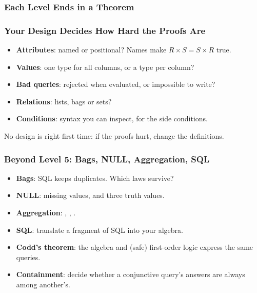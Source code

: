 \begin{frame*}
  \frametitle{Each Level Ends in a Theorem}
  {}
  \sketch
\end{frame*}

\begin{frame}
  \frametitle{Your Design Decides How Hard the Proofs Are}
  \begin{itemize}
    \item \textbf{Attributes}: named or positional? Names make
      $R \times S = S \times R$ true.
    \item \textbf{Values}: one type for all columns, or a type per
      column?
    \item \textbf{Bad queries}: rejected when evaluated, or impossible to
      write?
    \item \textbf{Relations}: lists, bags or sets?
    \item \textbf{Conditions}: syntax you can inspect, for the side
      conditions.
  \end{itemize}
  \begin{sticky}[halign = center]
    No design is right first time: if the proofs hurt, change the
    definitions.
  \end{sticky}
\end{frame}

\begin{frame}
  \frametitle{Beyond Level 5: Bags, NULL, Aggregation, SQL}
  \begin{itemize}
    \item \textbf{Bags}: SQL keeps duplicates. Which laws survive?
    \item \textbf{NULL}: missing values, and three truth values.
    \item \textbf{Aggregation}: , ,
      .
    \item \textbf{SQL}: translate a fragment of SQL into your algebra.
    \item \textbf{Codd's theorem}: the algebra and (safe) first-order
      logic express the same queries.
    \item \textbf{Containment}: decide whether a conjunctive query's
      answers are always among another's.
  \end{itemize}
  \stretchtag
\end{frame}

